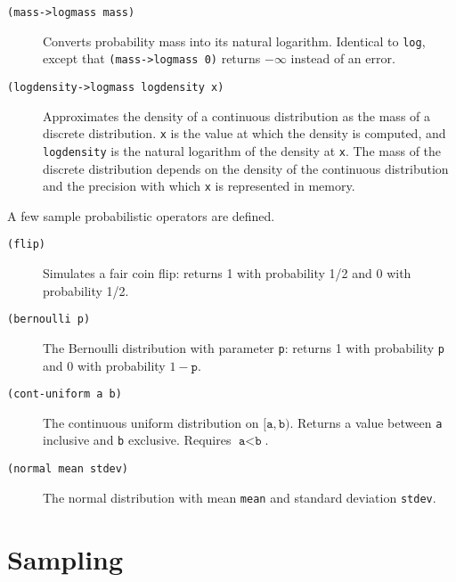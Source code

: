 \documentclass{article}
\begin{document}
\begin{description}
  \item[\texttt{(mass->logmass mass)}] \hfill

    Converts probability mass into its natural logarithm. Identical to
    \texttt{log}, except that \texttt{(mass->logmass 0)} returns
    $-\infty$ instead of an error.

  \item[\texttt{(logdensity->logmass logdensity x)}] \hfill

    Approximates the density of a continuous distribution as the mass
    of a discrete distribution. \texttt{x} is the value at which the
    density is computed, and \texttt{logdensity} is the natural
    logarithm of the density at \texttt{x}. The mass of the discrete
    distribution depends on the density of the continuous distribution
    and the precision with which \texttt{x} is represented in memory.
\end{description}

A few sample probabilistic operators are defined.

\begin{description}

\item[\texttt{(flip)}] \hfill

  Simulates a fair coin flip: returns 1 with probability 1/2 and 0
  with probability 1/2.

\item[\texttt{(bernoulli p)}] \hfill

  The Bernoulli distribution with parameter \texttt{p}: returns 1 with
  probability \texttt{p} and 0 with probability $1-\texttt{p}$.
  
\item[\texttt{(cont-uniform a b)}] \hfill

  The continuous uniform distribution on
  $[\texttt{a},\texttt{b})$. Returns a value between \texttt{a}
  inclusive and \texttt{b} exclusive. Requires $\texttt{a} <
  \texttt{b}$.
    
\item[\texttt{(normal mean stdev)}] \hfill

  The normal distribution with mean \texttt{mean} and standard
  deviation \texttt{stdev}.

\end{description}

\section{Sampling}
\label{sec:sampling}
\end{document}
